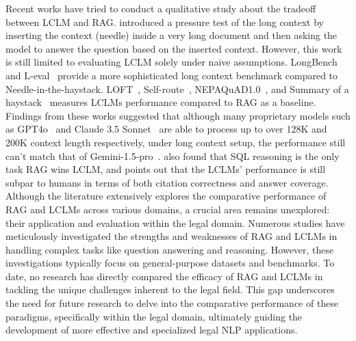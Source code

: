 {
Recent works have tried to conduct a qualitative study about the tradeoff between LCLM and RAG. 
%
\cite{needleinahaystack} introduced a pressure test of the long context by inserting the context (needle) inside a very long document and then asking the model to answer the question based on the inserted context. 
%
However, this work is still limited to evaluating LCLM solely under naive assumptions. 
%
LongBench~\cite{longbench} and L-eval~\cite{leval} provide a more sophisticated long context benchmark compared to Needle-in-the-haystack. 
%
LOFT~\cite{loft}, Self-route~\cite{selfroute}, NEPAQuAD1.0~\cite{nepaquad}, and Summary of a haystack~\cite{laban2024summaryhaystackchallengelongcontext} measures LCLMs performance compared to RAG as a baseline. 
%
Findings from these works suggested that although many proprietary models such as GPT4o~\cite{gpt4o} and Claude 3.5 Sonnet~\cite{claude3.5sonnet} are able to process up to over 128K and 200K context length respectively, under long context setup, the performance still can't match that of Gemini-1.5-pro~\cite{leval, selfroute, laban2024summaryhaystackchallengelongcontext}. 
%
\cite{loft} also found that SQL reasoning is the only task RAG wins LCLM, and \cite{laban2024summaryhaystackchallengelongcontext} points out that the LCLMs' performance is still subpar to humans in terms of both citation correctness and answer coverage. 
}
%
Although the literature extensively explores the comparative performance of RAG and LCLMs across various domains, a crucial area remains unexplored: their application and evaluation within the legal domain. 
%
Numerous studies have meticulously investigated the strengths and weaknesses of RAG and LCLMs in handling complex tasks like question answering and reasoning. 
%
However, these investigations typically focus on general-purpose datasets and benchmarks. 
%
To date, no research has directly compared the efficacy of RAG and LCLMs in tackling the unique challenges inherent to the legal field. 
%
This gap underscores the need for future research to delve into the comparative performance of these paradigms, specifically within the legal domain, ultimately guiding the development of more effective and specialized legal NLP applications.